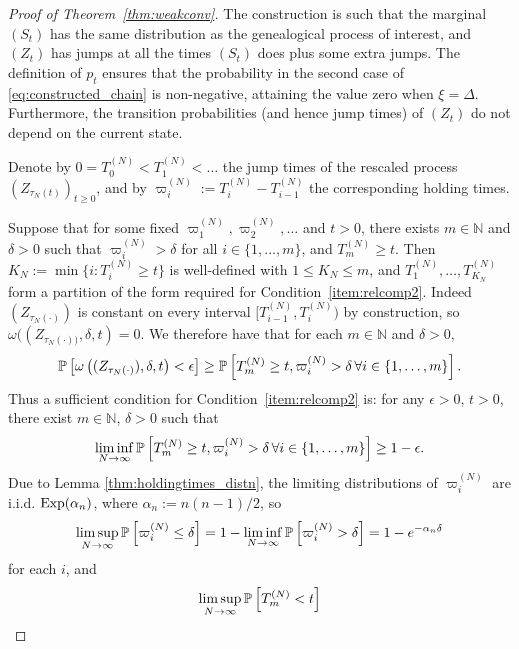 \begin{proof}[Proof of Theorem~\ref{thm:weakconv}]
The construction is such that the marginal $(S_t)$ has the same distribution as the genealogical process of interest, and $(Z_t)$ has jumps at all the times $(S_t)$ does plus some extra jumps. The definition of $p_t$ ensures that the probability in the second case of \eqref{eq:constructed_chain} is non-negative, attaining the value zero when $\xi=\Delta$.
Furthermore, the transition probabilities (and hence jump times) of $(Z_t)$ do not depend on the current state.

Denote by $0=T_0^{(N)}<T_1^{(N)}<\dots$ the jump times of the rescaled process $(Z_{\tau_N(t)})_{t\geq0}$, and by $\varpi_i^{(N)} := T_i^{(N)} - T_{i-1}^{(N)}$ the corresponding holding times.

Suppose that for some fixed $\varpi_1^{(N)}, \varpi_2^{(N)}, \dots$ and $t>0$, there exists $m \in \mathbb{N}$ and $\delta >0$ such that
$\varpi_i^{(N)} > \delta$ for all $i\in \{1,\dots,m\}$, and
$T_m^{(N)} \geq t$.
Then
$K_N := \min\{i : T_i^{(N)} \geq t\}$
is well-defined with $1\leq K_N \leq m$,
and $T_1^{(N)} , \dots, T_{K_N}^{(N)}$ form a partition of the form required for Condition~\ref{item:relcomp2}.
Indeed $(Z_{\tau_N(\cdot)})$ is constant on every interval $[ T_{i-1}^{(N)} , T_i^{(N)} )$ by construction, so $\omega( (Z_{\tau_N(\cdot))} , \delta, t ) = 0$. 
We therefore have that
for each $m \in \mathbb{N}$ and $\delta >0$,
\begin{equation*}
\mathbb{P}\left[ \omega\left( (Z_{\tau_N(\cdot)}) , \delta, t \right) < \epsilon \right]
\geq \mathbb{P}\left[ T_m^{(N)} \geq t, \varpi_i^{(N)} > \delta \,\forall i\in \{1,\dots,m\} \right] .
\end{equation*}
Thus a sufficient condition for Condition~\ref{item:relcomp2} is: 
for any $\epsilon>0$, $t>0$, there exist $m\in\mathbb{N}$, $\delta>0$ such that
\begin{equation}\label{eq:condition2b}
\liminf_{N\to\infty} \mathbb{P}\left[ T_m^{(N)} \geq t, \varpi_i^{(N)} > \delta \,\forall i\in \{1,\dots,m\} \right]
\geq 1-\epsilon .
\end{equation}
Due to Lemma \ref{thm:holdingtimes_distn}, the limiting distributions of $\varpi_i^{(N)}$ are i.i.d. $\operatorname{Exp}(\alpha_n)$, where $\alpha_n := n(n-1)/2$, so
\begin{equation*}
\limsup_{N\to\infty} \mathbb{P}\left[ \varpi_i^{(N)} \leq \delta \right] 
= 1- \liminf_{N\to\infty} \mathbb{P}\left[ \varpi_i^{(N)} > \delta \right] 
= 1- e^{-\alpha_n \delta}
\end{equation*}
for each $i$, and
\begin{align*}
\limsup_{N\to\infty} \Prob\left[ T_m^{(N)} < t \right]

\end{align*}
\end{proof}
